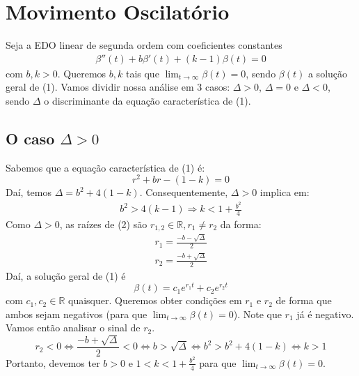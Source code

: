 \documentclass{article}
\begin{document}
\section{Movimento Oscilatório}
Seja a EDO linear de segunda ordem com coeficientes constantes
\begin{align}
\beta ''(t) + b\beta '(t) + (k - 1)\beta (t) = 0
\end{align} 
com $b,k>0$. Queremos $b,k$ tais que $\displaystyle{\lim_{t\to \infty}\beta (t) = 0}$, sendo $\beta (t)$ a solução geral de (1). Vamos dividir nossa análise em 3 casos: $\Delta > 0$, $\Delta = 0$ e $\Delta < 0$, sendo $\Delta$ o discriminante da equação característica de (1).
\subsection{O caso $\Delta > 0$}
\hspace{12pt} Sabemos que a equação característica de (1) é:
\begin{equation}
r^2 + br - (1 - k) = 0
\end{equation}
Daí, temos $\Delta = b^2 + 4(1 - k)$. Consequentemente, $\Delta > 0$ implica em:
\begin{align*}
b^2 > 4(k - 1) \Rightarrow k < 1 + \frac{b^2}{4}
\end{align*}
Como $\Delta > 0$, as raízes de (2) são $r_{1,2} \in\mathbb{R}, r_1 \neq r_2$ da forma:
\begin{align*}
r_1 = \frac{-b - \sqrt{\Delta}}{2} \\
r_2 = \frac{-b + \sqrt{\Delta}}{2}
\end{align*}
Daí, a solução geral de (1) é 
\begin{equation*}
\beta (t) = c_1e^{r_1t} + c_2e^{r_2t}
\end{equation*}
com $c_1, c_2\in\mathbb{R}$ quaisquer. Queremos obter condições em $r_1$ e $r_2$ de forma que ambos sejam negativos (para que $\displaystyle{\lim_{t\to \infty}\beta (t) = 0} $). Note que $r_1$ já é negativo. Vamos então analisar o sinal de $r_2$.
\begin{equation*}
r_2 < 0 \Leftrightarrow \frac{-b + \sqrt{\Delta}}{2} < 0 \Leftrightarrow b > \sqrt{\Delta} \Leftrightarrow b^2 > b^2 + 4(1-k) \Leftrightarrow k > 1
\end{equation*}
Portanto, devemos ter $b>0$ e $\displaystyle{1 < k < 1 + \frac{b^2}{4}}$ para que $\displaystyle{\lim_{t\to \infty}\beta (t) = 0}$.
\end{document}
